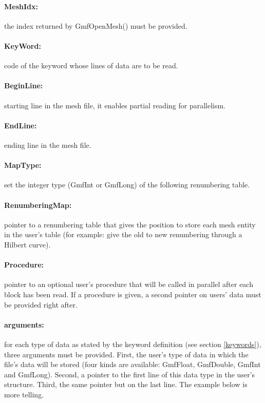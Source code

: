 \documentclass[a4paper,12pt]{article}
\begin{document}
\paragraph{MeshIdx:}
the index returned by GmfOpenMesh() must be provided.

\paragraph{KeyWord:} code of the keyword whose lines of data are to be read.

\paragraph{BeginLine:} starting line in the mesh file, it enables partial reading for parallelism.

\paragraph{EndLine:} ending line in the mesh file.

\paragraph{MapType:} set the integer type (GmfInt or GmfLong) of the following renumbering table.

\paragraph{RenumberingMap:} pointer to a renumbering table that gives the position to store each mesh entity in the user's table (for example: give the old to new renumbering through a Hilbert curve).

\paragraph{Procedure:} pointer to an optional user's procedure that will be called in  parallel after each block has been read. If a procedure is given, a second pointer on users' data must be provided right after.

\paragraph{arguments:} for each type of data as stated by the keyword definition (see section \ref{keywords}), three arguments must be provided. First, the user's type of data in which the file's data will be stored (four kinds are available: GmfFloat, GmfDouble, GmfInt and GmfLong). Second, a pointer to the first line of this data type in the user's structure. Third, the same pointer but on the last line. The example below is more telling.
\end{document}
